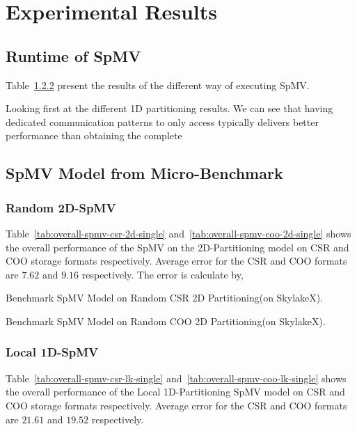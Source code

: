 \documentclass[sigconf,review,anonymous]{acmart}
\begin{document}
\section{Experimental Results}

\subsection{Runtime of SpMV}

Table~\ref{} present the results of the different way of executing SpMV.

Looking first at the different 1D partitioning results. We can see
that having dedicated communication patterns to only access typically
delivers better performance than obtaining the complete



\subsection{SpMV Model from Micro-Benchmark}
\subsubsection{Random 2D-SpMV}
Table~\ref{tab:overall-spmv-csr-2d-single} and~\ref{tab:overall-spmv-coo-2d-single} shows the overall performance of the 
SpMV on the 2D-Partitioning model on CSR and COO storage formats respectively.  Average error for the CSR and COO formats are 
$7.62$ and $9.16$ respectively. The error is calculate by,

\begin{table}[htb]
\caption{Benchmark SpMV Model on Random CSR 2D Partitioning(on SkylakeX).}
\label{tab:overall-spmv-csr-2d-single}
\let\center\empty
\let\endcenter\relax
\centering
\resizebox{.8\width}{!}{}

\end{table}

\begin{table}[htb]
\caption{Benchmark SpMV Model on Random COO 2D Partitioning(on SkylakeX).}
\label{tab:overall-spmv-coo-2d-single}
\let\center\empty
\let\endcenter\relax
\centering
\resizebox{.8\width}{!}{}
\end{table}

\subsubsection{Local 1D-SpMV}
Table~\ref{tab:overall-spmv-csr-lk-single} and~\ref{tab:overall-spmv-coo-lk-single} shows the overall performance of the Local 1D-Partitioning 
SpMV model on CSR and COO storage formats respectively.  Average error for the CSR and COO formats are 
$21.61$ and $19.52$ respectively. 
\end{document}
